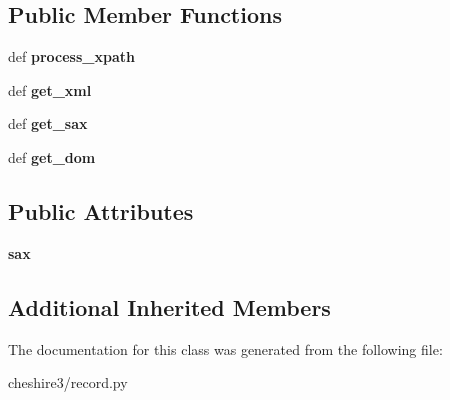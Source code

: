 \subsection*{Public Member Functions}
\begin{DoxyCompactItemize}
\item 
\hypertarget{classcheshire3_1_1record_1_1_minidom_record_1_1_lxml_record_ada19b11f27e53a9e5b8c5d37055780bb}{def {\bfseries process\-\_\-xpath}}\label{classcheshire3_1_1record_1_1_minidom_record_1_1_lxml_record_ada19b11f27e53a9e5b8c5d37055780bb}

\item 
\hypertarget{classcheshire3_1_1record_1_1_minidom_record_1_1_lxml_record_a376c971dbedf45e6e719901660a93068}{def {\bfseries get\-\_\-xml}}\label{classcheshire3_1_1record_1_1_minidom_record_1_1_lxml_record_a376c971dbedf45e6e719901660a93068}

\item 
\hypertarget{classcheshire3_1_1record_1_1_minidom_record_1_1_lxml_record_adb2ab28ce6c2a85bc0578dc37ce92702}{def {\bfseries get\-\_\-sax}}\label{classcheshire3_1_1record_1_1_minidom_record_1_1_lxml_record_adb2ab28ce6c2a85bc0578dc37ce92702}

\item 
\hypertarget{classcheshire3_1_1record_1_1_minidom_record_1_1_lxml_record_a010d2102c07b98c5eeb5bf5da886ea0a}{def {\bfseries get\-\_\-dom}}\label{classcheshire3_1_1record_1_1_minidom_record_1_1_lxml_record_a010d2102c07b98c5eeb5bf5da886ea0a}

\end{DoxyCompactItemize}
\subsection*{Public Attributes}
\begin{DoxyCompactItemize}
\item 
\hypertarget{classcheshire3_1_1record_1_1_minidom_record_1_1_lxml_record_ac3a3ae3a93e2fd47338758808edaeaf2}{{\bfseries sax}}\label{classcheshire3_1_1record_1_1_minidom_record_1_1_lxml_record_ac3a3ae3a93e2fd47338758808edaeaf2}

\end{DoxyCompactItemize}
\subsection*{Additional Inherited Members}


The documentation for this class was generated from the following file\-:\begin{DoxyCompactItemize}
\item 
cheshire3/record.\-py\end{DoxyCompactItemize}

